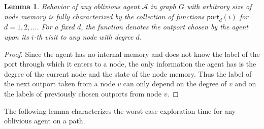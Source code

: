 \documentclass{article}[11pt,letter]
\newtheorem{lemma}[definition]{Lemma}
\newtheorem{lemma}[definition]{Lemma}
\newcommand{\agent}{\ensuremath{\mathcal{A}}\xspace}
\newcommand{\port}{\ensuremath{\mathsf{port}}}
\begin{document}
\begin{lemma}
\label{lem:behaviour}
Behavior of any oblivious agent $\agent$ in graph $G$ with arbitrary size of node memory is fully characterized by the collection of functions $\port_d(i)$ for $d=1,2,\dots$. For a fixed $d$, the function denotes the outport chosen by the agent upon its $i$-th visit to any node with degree $d$.
\end{lemma}
\begin{proof}
Since the agent has no internal memory and does not know the label of the port through which it enters to a node, the only information the agent has is the degree of the current node and the state of the node memory. Thus the label of the next outport taken from a node $v$ can only depend on the degree of $v$ and on the labels of previously chosen outports from node $v$. \end{proof}


The following lemma characterizes the worst-case exploration time for any oblivious agent on a path.
\end{document}

